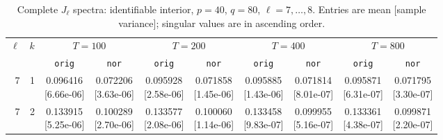 \documentclass[12pt,letterpaper]{article}
\def\spacingset#1{\renewcommand{\baselinestretch}{#1}\small\normalsize}
\theoremstyle{plain}
\theoremstyle{definition}
\begin{document}
\clearpage
\begin{table}[p]
\begingroup
\spacingset{1.0}
\small\centering
\caption{Complete $J_\ell$ spectra: identifiable interior, $p=40$, $q=80$, $\ell=7,\ldots,8$. Entries are mean [sample variance]; singular values are in ascending order.}
\label{s23:lambda:alltab:spectra:p40q80interior:7-8}
\footnotesize
\setlength{\tabcolsep}{2.2pt}
\renewcommand{\arraystretch}{1.03}
\begin{adjustbox}{max width=\linewidth}
\begin{tabular}{@{}rr*{8}{c}@{}}
\toprule
$\ell$ & $k$ & \multicolumn{2}{c}{$T=100$} & \multicolumn{2}{c}{$T=200$} & \multicolumn{2}{c}{$T=400$} & \multicolumn{2}{c}{$T=800$}\\
\cmidrule(lr){3-4}\cmidrule(lr){5-6}\cmidrule(lr){7-8}\cmidrule(lr){9-10}
 &  & \texttt{orig} & \texttt{nor} & \texttt{orig} & \texttt{nor} & \texttt{orig} & \texttt{nor} & \texttt{orig} & \texttt{nor}\\
\midrule
7 & 1 & \shortstack{0.096416\\[-1pt]{\scriptsize[6.66e-06]}} & \shortstack{0.072206\\[-1pt]{\scriptsize[3.63e-06]}} & \shortstack{0.095928\\[-1pt]{\scriptsize[2.58e-06]}} & \shortstack{0.071858\\[-1pt]{\scriptsize[1.45e-06]}} & \shortstack{0.095885\\[-1pt]{\scriptsize[1.43e-06]}} & \shortstack{0.071814\\[-1pt]{\scriptsize[8.01e-07]}} & \shortstack{0.095871\\[-1pt]{\scriptsize[6.31e-07]}} & \shortstack{0.071795\\[-1pt]{\scriptsize[3.30e-07]}}\\
7 & 2 & \shortstack{0.133915\\[-1pt]{\scriptsize[5.25e-06]}} & \shortstack{0.100289\\[-1pt]{\scriptsize[2.70e-06]}} & \shortstack{0.133577\\[-1pt]{\scriptsize[2.08e-06]}} & \shortstack{0.100060\\[-1pt]{\scriptsize[1.14e-06]}} & \shortstack{0.133458\\[-1pt]{\scriptsize[9.83e-07]}} & \shortstack{0.099955\\[-1pt]{\scriptsize[5.16e-07]}} & \shortstack{0.133361\\[-1pt]{\scriptsize[4.38e-07]}} & \shortstack{0.099871\\[-1pt]{\scriptsize[2.20e-07]}}\\

\end{tabular}
\end{adjustbox}
\end{table}
\end{document}
